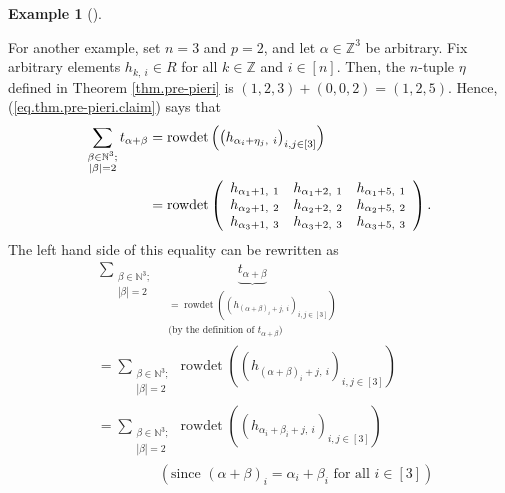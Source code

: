 \documentclass
[numbers=enddot,12pt,final,onecolumn,notitlepage,english]{scrartcl}%
\theoremstyle{definition}
\newtheorem{exam}[theo]{Example}
\newenvironment{example}[1][]
{\begin{exam}[#1]\begin{leftbar}}
{\end{leftbar}\end{exam}}
\let\sumnonlimits\sum
\renewcommand{\sum}{\sumnonlimits\limits}
\newenvironment{verlong}{}{}
\begin{document}
\begin{verlong}
\begin{example}
For another example, set $n=3$ and $p=2$, and let $\alpha\in\mathbb{Z}^{3}$ be
arbitrary. Fix arbitrary elements $h_{k,\ i}\in R$ for all $k\in\mathbb{Z}$
and $i\in\left[  n\right]  $. Then, the $n$-tuple $\eta$ defined in Theorem
\ref{thm.pre-pieri} is $\left(  1,2,3\right)  +\left(  0,0,2\right)  =\left(
1,2,5\right)  $. Hence, (\ref{eq.thm.pre-pieri.claim}) says that%
\begin{align*}
\sum_{\substack{\beta\in\mathbb{N}^{3};\\\left\vert \beta\right\vert
=2}}t_{\alpha+\beta}  &  =\operatorname*{rowdet}\left(  \left(  h_{\alpha
_{i}+\eta_{j},\ i}\right)  _{i,j\in\left[  3\right]  }\right) \\
&  =\operatorname*{rowdet}\left(
\begin{array}
[c]{ccc}%
h_{\alpha_{1}+1,\ 1} & h_{\alpha_{1}+2,\ 1} & h_{\alpha_{1}+5,\ 1}\\
h_{\alpha_{2}+1,\ 2} & h_{\alpha_{2}+2,\ 2} & h_{\alpha_{2}+5,\ 2}\\
h_{\alpha_{3}+1,\ 3} & h_{\alpha_{3}+2,\ 3} & h_{\alpha_{3}+5,\ 3}%
\end{array}
\right)  .
\end{align*}
The left hand side of this equality can be rewritten as%
\begin{align*}
&  \sum_{\substack{\beta\in\mathbb{N}^{3};\\\left\vert \beta\right\vert
=2}}\ \ \underbrace{t_{\alpha+\beta}}_{\substack{=\operatorname*{rowdet}%
\left(  \left(  h_{\left(  \alpha+\beta\right)  _{i}+j,\ i}\right)
_{i,j\in\left[  3\right]  }\right)  \\\text{(by the definition of }%
t_{\alpha+\beta}\text{)}}}\\
&  =\sum_{\substack{\beta\in\mathbb{N}^{3};\\\left\vert \beta\right\vert
=2}}\operatorname*{rowdet}\left(  \left(  h_{\left(  \alpha+\beta\right)
_{i}+j,\ i}\right)  _{i,j\in\left[  3\right]  }\right) \\
&  =\sum_{\substack{\beta\in\mathbb{N}^{3};\\\left\vert \beta\right\vert
=2}}\operatorname*{rowdet}\left(  \left(  h_{\alpha_{i}+\beta_{i}%
+j,\ i}\right)  _{i,j\in\left[  3\right]  }\right) \\
&  \ \ \ \ \ \ \ \ \ \ \ \ \ \ \ \ \ \ \ \ \left(  \text{since }\left(
\alpha+\beta\right)  _{i}=\alpha_{i}+\beta_{i}\text{ for all }i\in\left[
3\right]  \right) \\

\end{align*}
\end{example}
\end{verlong}
\end{document}
